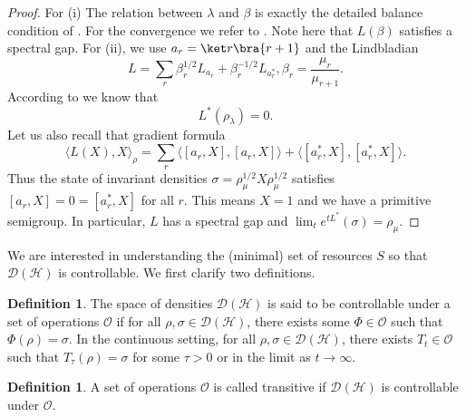 \documentclass[11pt,reqno]{amsart}
\theoremstyle{definition}
\newtheorem{lemma}[theorem]{Lemma}
\newtheorem{definition}[theorem]{Definition}
\newcommand{\mc}{\mathcal}
\newcommand{\lpara}{\left(}
\newcommand{\rpara}{\right)}
\newcommand{\lan}{\langle}
\newcommand{\ran}{\rangle}
\newcommand{\kla}{\left[}
\newcommand{\mer}{\right]}
\begin{document}

\begin{proof} For (i) The relation between $\lambda$ and $\beta$ is exactly the detailed balance condition of \cite{CM17}. For the convergence we refer to \cite{Jchen}. Note here that $L(\beta)$ satisfies a spectral gap.
    For (ii), we use $a_r=\ket r\bra{r+1}$ and the Lindbladian 
    \[ L = \sum_{r} \beta_r^{1/2}L_{a_r}+\beta_r^{-1/2} L_{a_r^*}  , 
    \beta_r = \frac{\mu_r}{\mu_{r+1}}  .\]
    According to \cite{CM17} we know that 
    \[ L^*(\rho_{\lambda}) = 0  .\] 
    Let us also recall that gradient formula \cite[(2.6)]{JLRR} 
    \[ \langle L(X),X\rangle_{\rho} =  \sum_{r} \langle [a_r,X],[a_r,X]\rangle +
    \langle [a_r^*,X],[a_r^*,X]\rangle  .\] 
    Thus the state of invariant densities $\sigma= \rho_{\mu}^{1/2}X\rho_{\mu}^{1/2}$ satisfies $[a_r,X]=0=[a_r^*,X]$ for all $r$. This means $X=1$ and we have a primitive semigroup. In particular, $L$ has a spectral gap and 
    $\lim_t e^{tL^*}(\sigma)=\rho_{\mu}$. 
\end{proof}

We are interested in understanding the (minimal) set of resources $S$ so that $\mc D(\mc H)$ is controllable. We first clarify two definitions.
\begin{definition}
    The space of densities $\mc D(\mc H)$ is said to be controllable under a set of operations $\mc O$ if for all $\rho,\sigma\in\mc D(\mc H)$, there exists some $\Phi\in\mc O$ such that $\Phi(\rho)=\sigma$. In the continuous setting, for all $\rho,\sigma\in\mc D(\mc H)$, there exists $T_t\in\mc O$ such that $T_\tau(\rho)=\sigma$ for some $\tau>0$ or in the limit as $t\rightarrow\infty$.
\end{definition}
\begin{definition}
    A set of operations $\mc O$ is called transitive if $\mc D(\mc H)$ is controllable under $\mc O$.
\end{definition}
  
\end{document}

